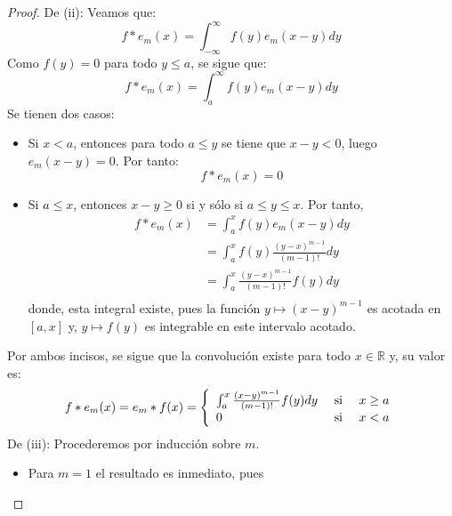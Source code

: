 \documentclass[12pt]{report}
\newcounter{it}
\theoremstyle{largebreak}
\begin{document}
\begin{proof}
        De (ii): Veamos que:
        \begin{equation*}
            f*e_m(x)=\int_{-\infty}^{\infty}f(y)e_m(x-y)dy
        \end{equation*}
        Como $f(y)=0$ para todo $y\leq a$, se sigue que:
        \begin{equation*}
            f*e_m(x)=\int_{a}^{\infty}f(y)e_m(x-y)dy
        \end{equation*}
        Se tienen dos casos:
        \begin{itemize}
            \item Si $x<a$, entonces para todo $a\leq y$ se tiene que $x-y<0$, luego $e_m(x-y)=0$. Por tanto:
            \begin{equation*}
                f*e_m(x)=0
            \end{equation*}
            \item Si $a\leq x$, entonces $x-y\geq 0$ si y sólo si $a\leq y\leq x$. Por tanto,
            \begin{equation*}
                \begin{split}
                    f*e_m(x)&=\int_{a}^{x}f(y)e_m(x-y)dy\\
                    &=\int_{a}^{x}f(y)\frac{(y-x)^{m-1}}{(m-1)!}dy\\
                    &=\int_{a}^{x}\frac{(y-x)^{m-1}}{(m-1)!}f(y)dy\\
                \end{split}
            \end{equation*}
            donde, esta integral existe, pues la función $y\mapsto (x-y)^{m-1}$ es acotada en $[a,x]$ y, $y\mapsto f(y)$ es integrable en este intervalo acotado.
        \end{itemize}
        Por ambos incisos, se sigue que la convolución existe para todo $x\in\mathbb{R}$ y, su valor es:
        \begin{equation*}
            f*e_m(x)=e_m*f(x)=\left\{
                \begin{array}{lcr}
                    \int_{a}^x\frac{(x-y)^{m-1}}{(m-1)!}f(y)dy & \textup{ si } & x\geq a \\
                    0 & \textup{ si }&x<a\\
                \end{array}
            \right.
        \end{equation*}
        De (iii): Procederemos por inducción sobre $m$. 
        \begin{itemize}
            \item Para $m=1$ el resultado es inmediato, pues

\end{itemize}
\end{proof}
\end{document}
